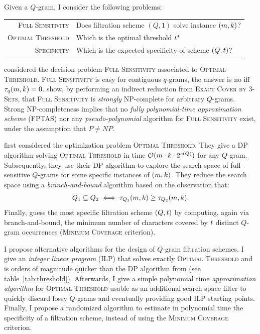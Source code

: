 Given a $Q$-gram, I consider the following problems:
\begin{table}[h]
\begin{tabular}{rl}
\textsc{Full Sensitivity} & Does filtration scheme $(Q,1)$ solve instance $(\Plen,k)$?\\
\textsc{Optimal Threshold} & Which is the optimal threshold $t^*$ \st $(Q,\Threshold^*)$ solves $(\Plen,k)$?\\
\textsc{Specificity} & Which is the expected specificity of scheme $(Q,t)$?\\
\end{tabular}
\end{table}

\cite{Nicolas2005} considered the decision problem \textsc{Full Sensitivity} associated to \textsc{Optimal Threshold}.
\textsc{Full Sensitivity} is easy for contiguous $q$-grams, \ie the answer is no iff $\tau_q(m,k) = 0$.
\citeauthor{Nicolas2005} show, by performing an indirect reduction from \textsc{Exact Cover by 3-Sets}, that \textsc{Full Sensitivity} is \emph{strongly} NP-complete for arbitrary $Q$-grams.
Strong NP-completeness implies that no \emph{fully polynomial-time approximation scheme} (FPTAS) nor any \emph{pseudo-polynomial} algorithm for \textsc{Full Sensitivity} exist, under the assumption that $P \neq NP$.

\cite{Burkhardt2001} first considered the optimization problem \textsc{Optimal Threshold}.
They give a DP algorithm solving \textsc{Optimal Threshold} in time $\mathcal{O}(m \cdot k \cdot 2^{s(Q)})$ for any $Q$-gram.
Subsequently, they use their DP algorithm to explore the search space of full-sensitive $Q$-grams for some specific instances of $(\Plen,k)$.
They reduce the search space using a \emph{branch-and-bound} algorithm based on the observation that:
\begin{eqnarray}
Q_1 \subseteq Q_2 \iff \tau_{Q_1}(m,k) \geq \tau_{Q_2}(m,k).
\end{eqnarray}
Finally, \citeauthor{Burkhardt2001} guess the most specific filtration scheme $(Q,t)$ by computing, again via branch-and-bound, the minimum number of characters covered by $t$ distinct $Q$-gram occurrences (\textsc{Minimum Coverage} criterion).

I propose alternative algorithms for the design of $Q$-gram filtration schemes.
I give an \emph{integer linear program} (ILP) that solves exactly \textsc{Optimal Threshold} and is orders of magnitude quicker than the DP algorithm from \citep{Burkhardt2001} (see table~\ref{tab:threshold}).
Afterwards, I give a simple polynomial time \emph{approximation algorithm} for \textsc{Optimal Threshold} usable as an additional search space filter to quickly discard lossy $Q$-grams and eventually providing good ILP starting points.
Finally, I propose a randomized algorithm to estimate in polynomial time the specificity of a filtration scheme, instead of using the \textsc{Minimum Coverage} criterion.


